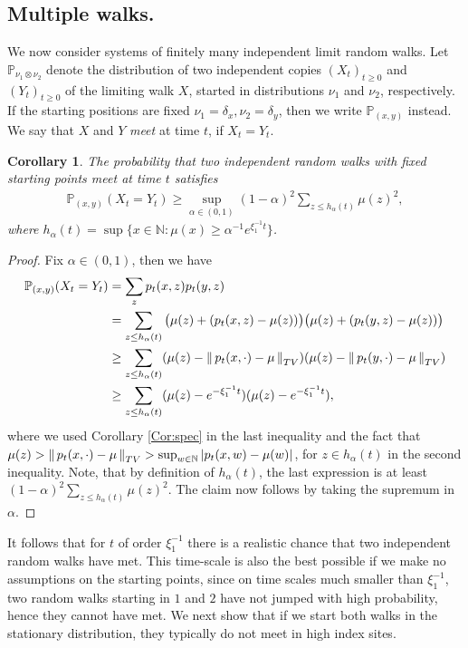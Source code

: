 \documentclass[11pt,a4paper]{scrartcl}
\numberwithin{equation}{section}
\theoremstyle{plain}
\newtheorem{corollary}[theorem]{Corollary}
\theoremstyle{definition}
\theoremstyle{remark}
\newcommand{\bN}{\ensuremath{\mathbb{N}}}
\newcommand{\bP}{\ensuremath{\mathbb{P}}}
\newcommand{\norm}[1]{\left\Vert \, #1 \, \right\Vert}
\begin{document}
\subsection*{Multiple walks.}
We now consider systems of finitely many independent limit random walks. Let $\bP_{\nu_1\otimes\nu_2}$ denote the distribution of two independent copies $(X_t)_{t\geq 0}$ and $(Y_t)_{t\geq 0}$ of the limiting walk $X$, started in distributions $\nu_1$ and $\nu_2$, respectively. If the starting positions are fixed $\nu_1=\delta_x, \nu_2=\delta_y$, then we write $\bP_{(x,y)}$ instead. We say that $X$ and $Y$ \emph{meet} at time $t$, if $X_t=Y_t$.
\begin{corollary}
The probability that two independent random walks with fixed starting points meet at time $t$ satisfies
\begin{align}
    \bP_{(x,y)}(X_t = Y_t) \geq \sup_{\alpha\in(0,1)}(1-\alpha)^2\sum_{z\leq h_\alpha(t)}\mu(z)^2,
\end{align}
where $h_\alpha(t) = \sup\{x\in\bN : \mu(x) \geq \alpha^{-1}e^{\xi_1^{-1}t} \}$.
\end{corollary}
\begin{proof}
Fix $\alpha\in(0,1)$, then we have
\begin{align}\label{eq:mult1}
\bP_{(x,y)}(X_t = Y_t) &= \sum_z p_t(x,z)p_t(y,z)   \\
&= \sum_{z\leq h_\alpha(t)} \big(\mu(z) + (p_t(x,z)-\mu(z)) \big) \big(\mu(z) + (p_t(y,z)-\mu(z)) \big)      \\
&\geq \sum_{z\leq h_\alpha(t)} (\mu(z) - \norm{p_t(x,\cdot)-\mu}_{\textup{TV}} ) (\mu(z) - \norm{p_t(y,\cdot)-\mu}_{\textup{TV}} )\\
&\geq \sum_{z\leq h_\alpha(t)} (\mu(z) - e^{-\xi_1^{-1}t} ) (\mu(z) - e^{-\xi_1^{-1}t} ),
\end{align}
where we used Corollary \ref{Cor:spec} in the last inequality and the fact that $\mu(z)>\norm{p_t(x,\cdot)-\mu}_{\textup{TV}}> \sup_{w\in\mathbb{N}} |p_t(x,w)-\mu(w)|$, for $z\in h_\alpha(t)$  in the second inequality.
Note, that by definition of $h_\alpha(t)$, the last expression is at least $(1-\alpha)^2\sum_{z\leq h_\alpha(t)}\mu(z)^2$. The claim now follows by taking the supremum in $\alpha$.
\end{proof}
It follows that for $t$ of order $\xi_1^{-1}$ there is a realistic chance that two independent random walks have met. This time-scale is also the best possible if we make no assumptions on the starting points, since on time scales much smaller than $\xi_1^{-1}$, two random walks starting in $1$ and $2$ have not jumped with high probability, hence they cannot have met. We next show that if we start both walks in the stationary distribution, they typically do not meet in high index sites. 
\end{document}
